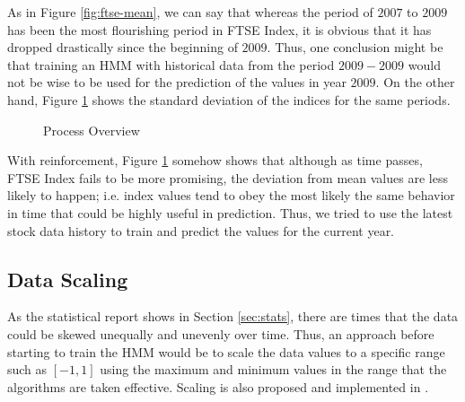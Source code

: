 \documentclass{acm_proc_article-sp}
\begin{document}
As in Figure \ref{fig:ftse-mean}, we can say that whereas the period of $2007$ to $2009$ has been the most
flourishing period in FTSE Index, it is obvious that it has dropped drastically since the beginning of $2009$. Thus,
one conclusion might be that training an HMM with historical data from the period $2009-2009$ would not be wise to be
used for the prediction of the values in year $2009$. On the other hand, Figure \ref{fig:ftse-std} shows the standard
deviation of the indices for the same periods.

\begin{figure}[h] 
\centering
\setlength\fboxsep{0.1pt}
\setlength\fboxrule{0.7pt}
\caption{Process Overview} \label{fig:ftse-std}
\end{figure}

With reinforcement, Figure \ref{fig:ftse-std} somehow shows that although as time passes, FTSE Index fails to be more
promising, the deviation from mean values are less likely to happen; i.e. index values tend to obey the most likely the
same behavior in time that could be highly useful in prediction. Thus, we tried to use the latest stock data history to
train and predict the values for the current year.

\subsection{Data Scaling} \label{sec:scale}
As the statistical report shows in Section \ref{sec:stats}, there are times that the data could be skewed unequally and
unevenly over time. Thus, an approach before starting to train the HMM would be to scale the data values to a specific
range such as $[-1, 1]$ using the maximum and minimum values in the range that the algorithms are taken effective.
Scaling is also proposed and implemented in \cite{hassan:hmm_stock_fuzzy}.
\end{document}
